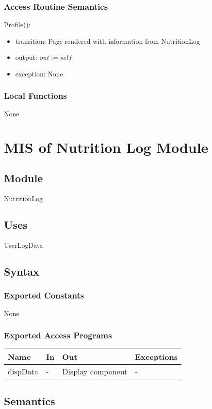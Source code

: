 \documentclass[12pt, titlepage]{article}
\begin{document}
\subsubsection{Access Routine Semantics}
\noindent Profile():
\begin{itemize}
	\item transition: Page rendered with information from NutritionLog
	\item output: $out := self$
	\item exception: None
\end{itemize}
\subsubsection{Local Functions}
None

\newpage

\section{MIS of Nutrition Log Module} \label{NutritionLog}
\subsection{Module}
NutritionLog
\subsection{Uses}
UserLogData
\subsection{Syntax}
\subsubsection{Exported Constants}
None
\subsubsection{Exported Access Programs}
\begin{center}
	\begin{tabular}{p{2cm} p{2.5cm} p{4cm} p{2cm}}
		\hline
		\textbf{Name} & \textbf{In} & \textbf{Out} & \textbf{Exceptions} \\
		\hline
		dispData & - & Display component & - \\
		\hline
	\end{tabular}
\end{center}
\subsection{Semantics}
\end{document}
